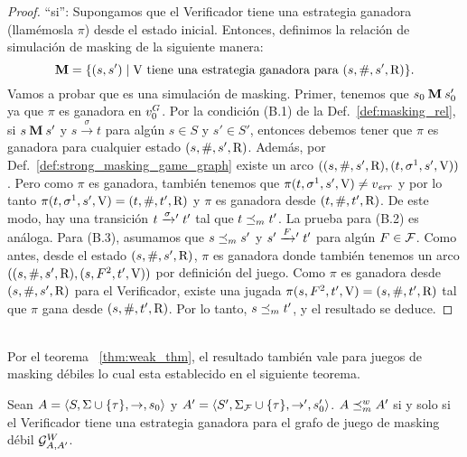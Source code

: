\begin{proof}
``si'': Supongamos que el Verificador tiene una estrategia ganadora (llamémosla $\pi$) 
desde el estado inicial. Entonces, definimos la relación de simulación de masking de la siguiente manera: 
\[
\mathbin{\mathbf{M}} = \{(s,s') \mid \mathrm{V} \text{ tiene una estrategia ganadora para } (s, \#, s', \mathrm{R}) \}.
\]
Vamos a probar que es una simulación de masking. 
Primer, tenemos que $s_0 \mathbin{\mathbf{M}} s'_0$ ya que $\pi$ es ganadora en $v_0^G$. Por la condición (B.1) de la Def.~\ref{def:masking_rel}, si
$s \mathbin{\mathbf{M}} s'$ y $s \xrightarrow{\sigma} t$ para algún $s \in S$ y $s' \in S'$, entonces debemos tener que $\pi$ es ganadora para cualquier estado $(s,\#,s',\mathrm{R})$. Además, por Def.~\ref{def:strong_masking_game_graph} existe un arco 
$((s,\#,s',\mathrm{R}), (t,\sigma^1,s',\mathrm{V}))$. 
Pero como $\pi$ es ganadora, también tenemos que $\pi(t,\sigma^1,s',\mathrm{V}) \neq v_{\mathit{err}}$ y 
por lo tanto $\pi(t,\sigma^1,s',\mathrm{V})=(t, \#, t', \mathrm{R})$ y $\pi$ es ganadora desde  $(t, \#, t', \mathrm{R})$.
De este modo, hay una transición $t \mathrel{{\xrightarrow[]{\sigma}}{}'} t'$ tal que
$t \preceq_{m} t'$. La prueba para (B.2) es análoga. Para (B.3), asumamos que $s \preceq_{m} s'$ y $s' \mathrel{{\xrightarrow[]{F}}{}'} t'$ para algún 
$F \in \mathcal{F}$. 
Como antes, desde el estado $(s,\#,s',\mathrm{R})$, $\pi$ es ganadora donde también tenemos un arco $((s,\#,s',\mathrm{R}), (s,F^2,t',\mathrm{V}))$ por definición del juego. 
Como $\pi$ es ganadora desde $(s,\#,s',\mathrm{R})$ para el Verificador, existe una jugada $\pi(s,F^2,t',\mathrm{V}) = (s,\#,t',\mathrm{R})$ tal que $\pi$ gana desde 
$(s,\#,t',\mathrm{R})$. Por lo tanto, $s \preceq_{m} t'$, y el resultado se deduce.
\qedhere

\end{proof} \\

Por el teorema ~\ref{thm:weak_thm}, el resultado también vale para juegos de masking débiles lo cual esta establecido en el siguiente teorema.

\begin{thm} \label{thm:weak_wingame_strat}
  Sean $A=\langle S, \Sigma \cup \{\tau\}, \rightarrow, s_0 \rangle$ y
  $A'=\langle S', \Sigma_{\mathcal{F}} \cup \{\tau\}, \rightarrow', s'_0 \rangle$.
  $A \preceq^w_{m} A'$ si y solo si el Verificador tiene una estrategia ganadora para el grafo de juego de masking débil $\mathcal{G}^W_{A,A'}$.
\end{thm}

